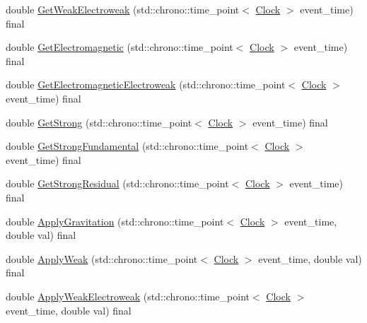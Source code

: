 \begin{DoxyCompactItemize}
double \mbox{\hyperlink{classCognitiveNetwork_aa6342c390fe8e7c648b4c6bc8f93ba4a}{Get\+Weak\+Electroweak}} (std\+::chrono\+::time\+\_\+point$<$ \mbox{\hyperlink{universe_8h_a0ef8d951d1ca5ab3cfaf7ab4c7a6fd80}{Clock}} $>$ event\+\_\+time) final
\item 
double \mbox{\hyperlink{classCognitiveNetwork_a09e5a1c774c84529a7adfe56fadb7467}{Get\+Electromagnetic}} (std\+::chrono\+::time\+\_\+point$<$ \mbox{\hyperlink{universe_8h_a0ef8d951d1ca5ab3cfaf7ab4c7a6fd80}{Clock}} $>$ event\+\_\+time) final
\item 
double \mbox{\hyperlink{classCognitiveNetwork_a8c4e0454068f714691ae250f795cdb67}{Get\+Electromagnetic\+Electroweak}} (std\+::chrono\+::time\+\_\+point$<$ \mbox{\hyperlink{universe_8h_a0ef8d951d1ca5ab3cfaf7ab4c7a6fd80}{Clock}} $>$ event\+\_\+time) final
\item 
double \mbox{\hyperlink{classCognitiveNetwork_a277247686f8af159e7a7beb0ec379225}{Get\+Strong}} (std\+::chrono\+::time\+\_\+point$<$ \mbox{\hyperlink{universe_8h_a0ef8d951d1ca5ab3cfaf7ab4c7a6fd80}{Clock}} $>$ event\+\_\+time) final
\item 
double \mbox{\hyperlink{classCognitiveNetwork_a942ca90561fedae46136de620accbfea}{Get\+Strong\+Fundamental}} (std\+::chrono\+::time\+\_\+point$<$ \mbox{\hyperlink{universe_8h_a0ef8d951d1ca5ab3cfaf7ab4c7a6fd80}{Clock}} $>$ event\+\_\+time) final
\item 
double \mbox{\hyperlink{classCognitiveNetwork_acfa5de663b3e686c4d9ea1a3bb483b11}{Get\+Strong\+Residual}} (std\+::chrono\+::time\+\_\+point$<$ \mbox{\hyperlink{universe_8h_a0ef8d951d1ca5ab3cfaf7ab4c7a6fd80}{Clock}} $>$ event\+\_\+time) final
\item 
double \mbox{\hyperlink{classCognitiveNetwork_a7d3252977440a9a5c004f748647ce885}{Apply\+Gravitation}} (std\+::chrono\+::time\+\_\+point$<$ \mbox{\hyperlink{universe_8h_a0ef8d951d1ca5ab3cfaf7ab4c7a6fd80}{Clock}} $>$ event\+\_\+time, double val) final
\item 
double \mbox{\hyperlink{classCognitiveNetwork_a46a15b24bd61049fa1c4f635268086a1}{Apply\+Weak}} (std\+::chrono\+::time\+\_\+point$<$ \mbox{\hyperlink{universe_8h_a0ef8d951d1ca5ab3cfaf7ab4c7a6fd80}{Clock}} $>$ event\+\_\+time, double val) final
\item 
double \mbox{\hyperlink{classCognitiveNetwork_ab8bc213d2806f0dc49c1284bf934fc24}{Apply\+Weak\+Electroweak}} (std\+::chrono\+::time\+\_\+point$<$ \mbox{\hyperlink{universe_8h_a0ef8d951d1ca5ab3cfaf7ab4c7a6fd80}{Clock}} $>$ event\+\_\+time, double val) final
\item 

\end{DoxyCompactItemize}

